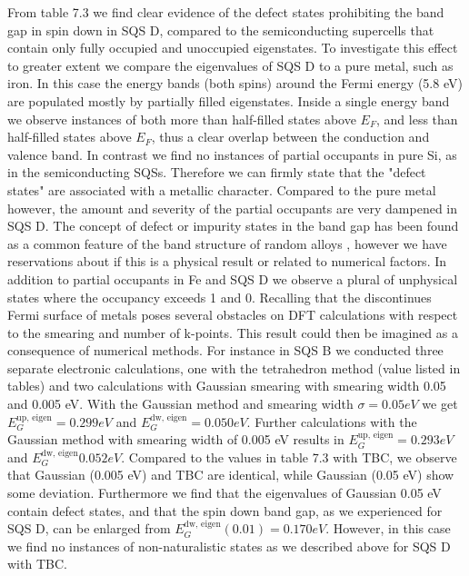 From table 7.3 we find clear evidence of the defect states prohibiting the band gap in spin down in SQS D, compared to the semiconducting supercells that contain only fully occupied and unoccupied eigenstates. To investigate this effect to greater extent we compare the eigenvalues of SQS D to a pure metal, such as iron. In this case the energy bands (both spins) around the Fermi energy (5.8 eV) are populated mostly by partially filled eigenstates. Inside a single energy band we observe instances of both more than half-filled states above $E_F$, and less than half-filled states above $E_F$, thus a clear overlap between the conduction and valence band. In contrast we find no instances of partial occupants in pure Si, as in the semiconducting SQSs. Therefore we can firmly state that the "defect states" are associated with a metallic character. Compared to the pure metal however, the amount and severity of the partial occupants are very dampened in SQS D. The concept of defect or impurity states in the band gap has been found as a common feature of the band structure of random alloys \cite{PhysRevLett.104.236403}, however we have reservations about if this is a physical result or related to numerical factors. In addition to partial occupants in Fe and SQS D we observe a plural of unphysical states where the occupancy exceeds 1 and 0. Recalling that the discontinues Fermi surface of metals poses several obstacles on DFT calculations with respect to the smearing and number of k-points. This result could then be imagined as a consequence of numerical methods. For instance in SQS B we conducted three separate electronic calculations, one with the tetrahedron method (value listed in tables) and two calculations with Gaussian smearing with smearing width 0.05 and 0.005 eV. With the Gaussian method and smearing width $\sigma = 0.05 eV$ we get $E_G ^\text{up, eigen} = 0.299 eV$ and $E_G ^\text{dw, eigen} = 0.050 eV$. Further calculations with the Gaussian method with smearing width of 0.005 eV results in $E_G ^\text{up, eigen} = 0.293 eV$ and $E_G ^\text{dw, eigen} 0.052 eV$. Compared to the values in table 7.3 with TBC, we observe that Gaussian (0.005 eV) and TBC are identical, while Gaussian (0.05 eV) show some deviation. Furthermore we find that the eigenvalues of Gaussian 0.05 eV contain defect states, and that the spin down band gap, as we experienced for SQS D, can be enlarged from $E_G ^\text{dw, eigen}(0.01) = 0.170 eV$. However, in this case we find no instances of non-naturalistic states as we described above for SQS D with TBC.
  
